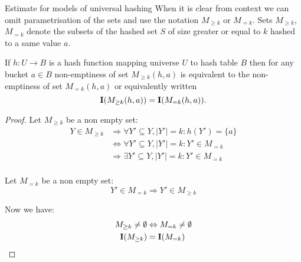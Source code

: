 \begin{section}{Estimate for models of universal hashing}
When it is clear from context we can omit parametrisation of the sets and use the notation $M_{\geq k}$ or $M_{= k}$. Sets $M_{\geq k}$, $M_{= k}$ denote the subsets of the hashed set $S$ of size greater or equal to $k$ hashed to a same value $a$. 

\begin{lemma}
\label{lemma-indicator-k-collision}
If $h: U \rightarrow B$ is a hash function mapping universe $U$ to hash table $B$ then for any bucket $a \in B$ non-emptiness of set $M_{\geq k}(h, a)$ is equivalent to the non-emptiness of set $M_{= k}(h, a)$ or equivalently written
\begin{displaymath}
\mathbf{I}(M_{\geq k}(h, a)) = \mathbf{I}(M_{= k}(h, a)) \text{.}
\end{displaymath}
\begin{proof}
Let $M_{\geq k}$ be a non empty set:
\begin{displaymath}
\begin{split}
Y \in M_{\geq k} 
	& \Rightarrow \forall Y' \subseteq Y, |Y'| = k: h(Y') = \{a\} \\
	& \Leftrightarrow \forall Y' \subseteq Y, |Y'| = k: Y' \in M_{=k} \\
	& \Rightarrow \exists Y' \subseteq Y, |Y'| = k: Y' \in M_{=k} \\
\end{split}
\end{displaymath}

Let $M_{=k}$ be a non empty set:
\begin{displaymath}
Y' \in M_{=k} \Rightarrow Y' \in M_{\geq k}
\end{displaymath}

Now we have:
\begin{displaymath}
\begin{split}
M_{\geq k} \neq \emptyset & \Leftrightarrow  M_{= k} \neq \emptyset \\
\mathbf{I}(M_{\geq k}) & = \mathbf{I}(M_{= k})
\end{split}
\end{displaymath}
\end{proof}
\end{lemma}


\end{section}
